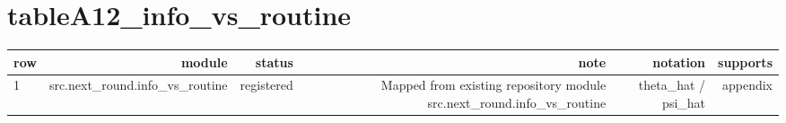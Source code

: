 \documentclass{article}
\begin{document}
\section*{tableA12_info_vs_routine}
\begin{tabular}{lrrrrr}
\hline
row & module & status & note & notation & supports \\
\hline
1 & src.next\_round.info\_vs\_routine & registered & Mapped from existing repository module src.next\_round.info\_vs\_routine & theta\_hat / psi\_hat & appendix \\
\hline
\end{tabular}
\end{document}
